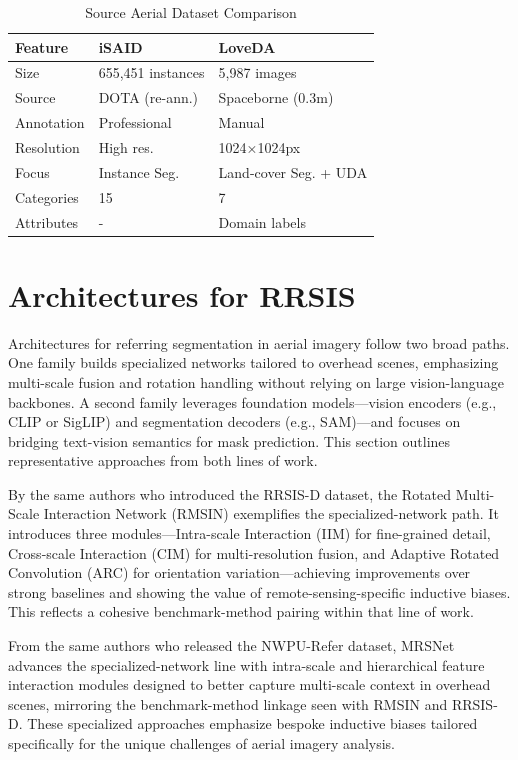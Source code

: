 \begin{table}[htbp]
\centering
\caption{Source Aerial Dataset Comparison}
\label{tab:source_comparison}
\begin{tabular}{@{}lll@{}}
\toprule
\textbf{Feature} & \textbf{iSAID} & \textbf{LoveDA} \\
\midrule
Size & 655,451 instances & 5,987 images \\
Source & DOTA (re-ann.) & Spaceborne (0.3m) \\
Annotation & Professional & Manual \\
Resolution & High res. & 1024×1024px \\
Focus & Instance Seg. & Land-cover Seg. + UDA \\
Categories & 15 & 7 \\
Attributes & - & Domain labels \\
\bottomrule
\end{tabular}
\end{table}


\section{Architectures for RRSIS}

Architectures for referring segmentation in aerial imagery follow two broad paths. One family builds specialized networks tailored to overhead scenes, emphasizing multi-scale fusion and rotation handling without relying on large vision-language backbones. A second family leverages foundation models—vision encoders (e.g., CLIP or SigLIP) and segmentation decoders (e.g., SAM)—and focuses on bridging text-vision semantics for mask prediction. This section outlines representative approaches from both lines of work.

By the same authors who introduced the RRSIS-D dataset, the Rotated Multi-Scale Interaction Network (RMSIN) exemplifies the specialized-network path. It introduces three modules—Intra-scale Interaction (IIM) for fine-grained detail, Cross-scale Interaction (CIM) for multi-resolution fusion, and Adaptive Rotated Convolution (ARC) for orientation variation—achieving improvements over strong baselines and showing the value of remote-sensing-specific inductive biases. This reflects a cohesive benchmark-method pairing within that line of work.

From the same authors who released the NWPU-Refer dataset, MRSNet advances the specialized-network line with intra-scale and hierarchical feature interaction modules designed to better capture multi-scale context in overhead scenes, mirroring the benchmark-method linkage seen with RMSIN and RRSIS-D. These specialized approaches emphasize bespoke inductive biases tailored specifically for the unique challenges of aerial imagery analysis.

